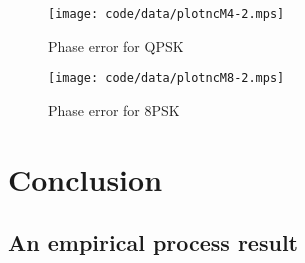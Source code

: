 \documentclass[journal]{IEEEtran}
\begin{document}


\begin{figure}[tp]
	\centering
		\texttt{[image: code/data/plotncM4-2.mps]}
		\caption{Phase error for QPSK}
		\label{fig:plotphase}
\end{figure}




\begin{figure}[tp]
	\centering
		\texttt{[image: code/data/plotncM8-2.mps]}
		\caption{Phase error for 8PSK}
		\label{fig:plotphase}
\end{figure}



\section{Conclusion}

\small



\normalsize
\appendix


\subsection{An empirical process result}
\end{document}
